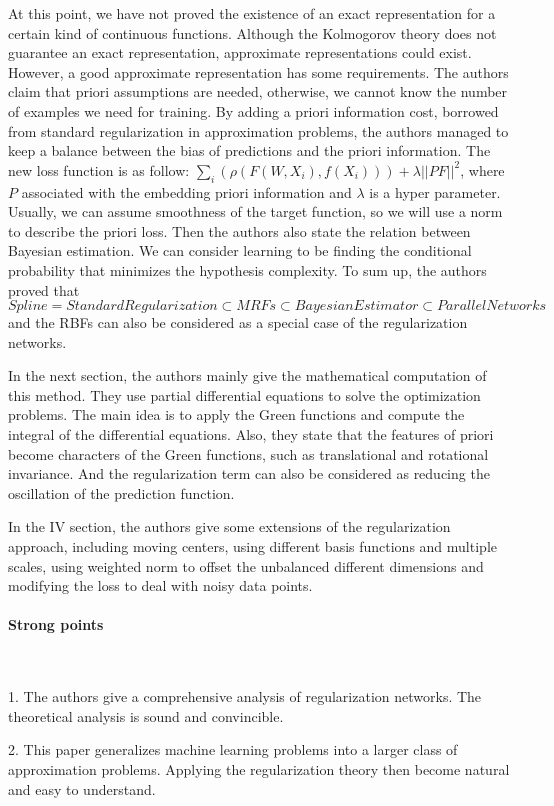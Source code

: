 \documentclass{article}
\begin{document}
At this point, we have not proved the existence of an exact representation for a certain kind of continuous functions. Although the Kolmogorov theory does not guarantee an exact representation, approximate representations could exist. However, a good approximate representation has some requirements. The authors claim that priori assumptions are needed, otherwise, we cannot know the number of examples we need for training. By adding a priori information cost, borrowed from standard regularization in approximation problems, the authors managed to keep a balance between the bias of predictions and the priori information.
The new loss function is as follow: $\sum_i(\rho(F(W,X_i), f(X_i))) + \lambda ||PF||^2$, where $P$ associated with the embedding priori information and $\lambda$ is a hyper parameter. Usually, we can assume smoothness of the target function, so we will use a norm to describe the priori loss. Then the authors also state the relation between Bayesian estimation. We can consider learning to be finding the conditional probability that minimizes the hypothesis complexity. To sum up, the authors proved that $Spline = Standard Regularization \subset MRFs \subset Bayesian Estimator \subset Parallel Networks$ and the RBFs can also be considered as a special case of the regularization networks.

In the next section, the authors mainly give the mathematical computation of this method. They use partial differential equations to solve the optimization problems. The main idea is to apply the Green functions and compute the integral of the differential equations. Also, they state that the features of priori become characters of the Green functions, such as translational and rotational invariance. And the regularization term can also be considered as reducing the oscillation of the prediction function.

In the IV section, the authors give some extensions of the regularization approach, including moving centers, using different basis functions and multiple scales, using weighted norm to offset the unbalanced different dimensions and modifying the loss to deal with noisy data points.
\paragraph{Strong points} \

1. The authors give a comprehensive analysis of regularization networks. The theoretical analysis is sound and convincible.

2. This paper generalizes machine learning problems into a larger class of approximation problems. Applying the regularization theory then become natural and easy to understand.
\end{document}

